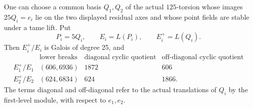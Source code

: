 \begin{lemma}
\label{lem:B-RD90-point-towers}
One can choose a common basis \(Q_1,Q_2\) of the actual \(125\)-torsion
whose images \(25Q_i=e_i\) lie on the two displayed residual axes and
whose point fields are stable under a tame lift. Put
\[
 P_i=5Q_i,\qquad E_i=L(P_i),\qquad E_i^+=L(Q_i).
\]
Then \(E_i^+/E_i\) is Galois of degree 25, and
\[
\begin{array}{c|c|c|c}
 &\text{lower breaks}&\text{diagonal cyclic quotient}&
       \text{off-diagonal cyclic quotient}\\\hline
 E_1^+/E_1&(606,6936)&1872&606\\
 E_2^+/E_2&(624,6834)&624&1866.
\end{array}                                                   \tag{B-RD90.2}
\]
The terms diagonal and off-diagonal refer to the actual translations
of \(Q_i\) by the first-level module, with respect to \(e_1,e_2\).
\end{lemma}
